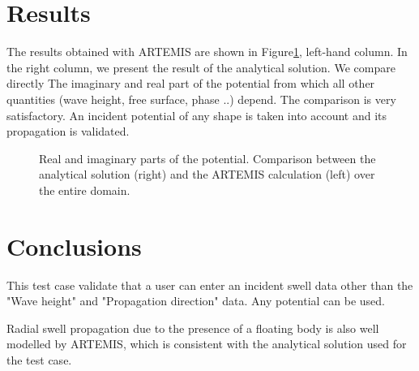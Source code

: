 \section{Results}
The results obtained with ARTEMIS are shown in Figure\ref{fig:kochin_resu}, left-hand column.
In the right column, we present the result of the analytical solution. We compare directly
The imaginary and real part of the potential from which all other quantities (wave height,
free surface, phase ..) depend. 
The comparison is very satisfactory. An incident potential of any shape is taken into
account and its propagation is validated.

\begin{figure}[h]
\begin{center}
\end{center}
\caption{Real and imaginary parts of the potential. Comparison between the analytical
  solution (right) and the ARTEMIS calculation (left) over the entire domain.}
\label{fig:kochin_resu}
\end{figure}


\section{Conclusions}
This test case validate that a user can enter an incident swell data other than the
"Wave height" and "Propagation direction" data. Any potential can be used. 

Radial swell propagation due to the presence of a floating body is also well modelled by
ARTEMIS, which is consistent with the analytical solution used for the test case.
